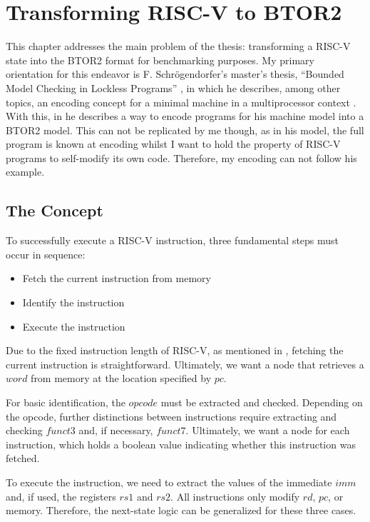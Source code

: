 \chapter{Transforming RISC-V to BTOR2}\label{chap:riscv_to_btor2}


This chapter addresses the main problem of the thesis: transforming a
RISC-V state into the BTOR2 format for benchmarking purposes. My
primary orientation for this endeavor is F. Schrögendorfer's master's
thesis, \enquote{Bounded Model Checking in Lockless Programs}
\cite{bmcOfLockless}, in which he describes, among other topics, an
encoding concept for a minimal machine in a multiprocessor context
\cite[Chapter 2]{bmcOfLockless}. With this, in \cite[Chapter
    8]{bmcOfLockless} he describes a way to encode programs for his
machine model into a BTOR2 model. This can not be replicated by me
though, as in his model, the full program is known at encoding whilst
I want to hold the property of RISC-V programs to self-modify its own
code. Therefore, my encoding can not follow his example.

\section{The Concept}
To successfully execute a RISC-V instruction, three fundamental steps
must occur in sequence:
\begin{itemize}
    \item Fetch the current instruction from memory
    \item Identify the instruction
    \item Execute the instruction
\end{itemize}
Due to the fixed instruction length of RISC-V, as mentioned in
, fetching the current instruction is straightforward.
Ultimately, we want a node that retrieves a $word$ from memory at the location
specified by $pc$.

For basic identification, the $opcode$ must be extracted and checked.
Depending on the opcode, further distinctions between instructions
require extracting and checking $funct3$ and, if necessary, $funct7$.
Ultimately, we want a node for each instruction, which holds a
boolean value indicating whether this instruction was fetched.

To execute the instruction, we need to extract the values of the
immediate $imm$ and, if used, the registers $rs1$ and $rs2$. All
instructions only modify $rd$, $pc$, or memory. Therefore, the
next-state logic can be generalized for these three cases.

